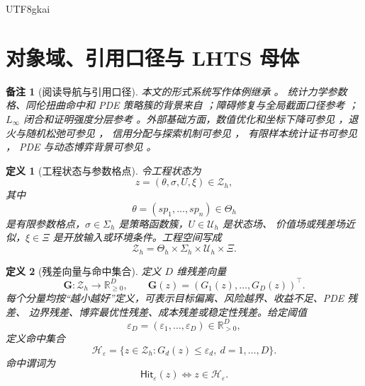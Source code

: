\documentclass[12pt]{article}
\newtheorem{definition}{定义}[section]
\newtheorem{remark}{备注}[section]
\newcommand{\RR}{\mathbb{R}}
\newcommand{\Hit}{\ensuremath{\mathsf{Hit}}}
\newcommand{\Linfty}{\ensuremath{L_\infty}}
\begin{document}
\begin{CJK*}{UTF8}{gkai}
\setcounter{tocdepth}{3}
\setcounter{secnumdepth}{3}
\tableofcontents
\clearpage

\section{对象域、引用口径与 LHTS 母体}
\label{sec:lhts-object-domain}

\begin{remark}[阅读导航与引用口径]
本文的形式系统写作体例继承 \cite{RepoTex37SemanticGauge,RepoTex55PDEParadigm}。
统计力学参数格、同伦扭曲命中和 PDE 策略簇的背景来自
\cite{RepoTex53StrategyCluster}；障碍修复与全局截面口径参考
\cite{RepoTex45ObstructionGlobalSection}；\(\Linfty\) 闭合和证明强度分层参考
\cite{RepoTex50LinftyRepair}。外部基础方面，数值优化和坐标下降可参见
\cite{NocedalWright2006Optimization}，退火与随机松弛可参见
\cite{Kirkpatrick1983Optimization,GemanGeman1984StochasticRelaxation}，
信用分配与探索机制可参见 \cite{SuttonBarto2018RL}，
有限样本统计证书可参见 \cite{Hoeffding1963Probability}，
PDE 与动态博弈背景可参见 \cite{Evans2010PDE,BasarOlsder1999DynamicGames}。
\end{remark}

\begin{definition}[工程状态与参数格点]
\label{def:lhts-state}
令工程状态为
\[
  z=(\theta,\sigma,U,\xi)\in\mathcal Z_h,
\]
其中
\[
  \theta=(sp_1,\ldots,sp_n)\in\Theta_h
\]
是有限参数格点，\(\sigma\in\Sigma_h\) 是策略函数簇，\(U\in\mathcal U_h\) 是状态场、
价值场或残差场近似，\(\xi\in\Xi\) 是开放输入或环境条件。工程空间写成
\[
  \mathcal Z_h
  =
  \Theta_h\times\Sigma_h\times\mathcal U_h\times\Xi .
\]
\end{definition}

\begin{definition}[残差向量与命中集合]
\label{def:lhts-residual-hit}
定义 \(D\) 维残差向量
\[
  \mathbf G:\mathcal Z_h\to\RR_{\ge0}^{D},
  \qquad
  \mathbf G(z)=
  (G_1(z),\ldots,G_D(z))^\top .
\]
每个分量均按“越小越好”定义，可表示目标偏离、风险越界、收益不足、PDE 残差、
边界残差、博弈最优性残差、成本残差或稳定性残差。给定阈值
\[
  \varepsilon_D=(\varepsilon_1,\ldots,\varepsilon_D)\in\RR_{>0}^{D},
\]
定义命中集合
\[
  \mathcal H_{\varepsilon}
  =
  \{z\in\mathcal Z_h:
  G_d(z)\le \varepsilon_d,\ d=1,\ldots,D\}.
\]
命中谓词为
\[
  \Hit_{\varepsilon}(z)
  \Longleftrightarrow
  z\in\mathcal H_{\varepsilon}.
\]
\end{definition}


\end{CJK*}
\end{document}
